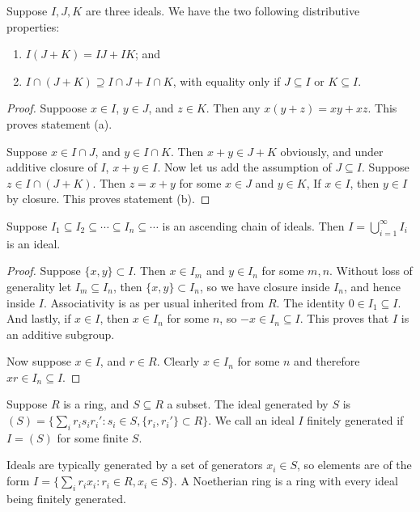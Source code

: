 \begin{proposition}\label{prop:ideal-distributive}
    Suppose \(I,J,K\) are three ideals.
    We have the two following distributive properties:
    \begin{enumerate}[label={(\alph*)}, itemsep=0mm]
        \item \(I(J+K) = IJ + IK\); and
        \item \(I \cap (J+K) \supseteq I \cap J + I \cap K\),
            with equality only if \(J \subseteq I\) or \(K \subseteq I\).
    \end{enumerate}
\end{proposition}
\begin{proof}
    Suppoose \(x \in I\), \(y \in J\), and \(z \in K\).
    Then any \(x(y+z) = xy + xz\).
    This proves statement (a).

    Suppose \(x \in I \cap J\), and \(y \in I \cap K\).
    Then \(x+y \in J+K\) obviously,
    and under additive closure of \(I\), \(x+y \in I\).
    Now let us add the assumption of \(J \subseteq I\).
    Suppose \(z \in I \cap (J+K)\).
    Then \(z = x+y\) for some \(x \in J\) and \(y \in K\),
    If \(x \in I\), then \(y \in I\) by closure.
    This proves statement (b).
\end{proof}
\begin{proposition}\label{prop:nested-ideals}
    Suppose \(I_1 \subseteq I_2 \subseteq \cdots \subseteq
    I_n \subseteq \cdots\) is an ascending chain of ideals.
    Then \(I = \bigcup_{i=1}^\infty I_i\) is an ideal.
\end{proposition}
\begin{proof}
    Suppose \(\{x,y\} \subset I\).
    Then \(x \in I_m\) and \(y \in I_n\) for some \(m,n\).
    Without loss of generality let \(I_m \subseteq I_n\),
    then \(\{x,y\} \subset I_n\),
    so we have closure inside \(I_n\), and hence inside \(I\).
    Associativity is as per usual inherited from \(R\).
    The identity \(0 \in I_1 \subseteq I\).
    And lastly, if \(x \in I\), then \(x \in I_n\) for some \(n\),
    so \(-x \in I_n \subseteq I\).
    This proves that \(I\) is an additive subgroup.
    
    Now suppose \(x \in I\), and \(r \in R\).
    Clearly \(x \in I_n\) for some \(n\)
    and therefore \(xr \in I_n \subseteq I\).
\end{proof}


\begin{definition}
    Suppose \(R\) is a ring, and \(S \subseteq R\) a subset.
    The ideal generated by \(S\) is
    \((S) = \{\sum_i r_i s_i r_i' : s_i \in S, \{r_i,r_i'\} \subset R\}\).
    We call an ideal \(I\) finitely generated
    if \(I = (S)\) for some finite \(S\).
\end{definition}
\begin{remark}
    Ideals are typically generated by a set of generators \(x_i \in S\),
    so elements are of the form
    \(I = \{\sum_i r_i x_i : r_i \in R, x_i \in S\}\).
    A Noetherian ring is a ring with every ideal being finitely generated.
\end{remark}


